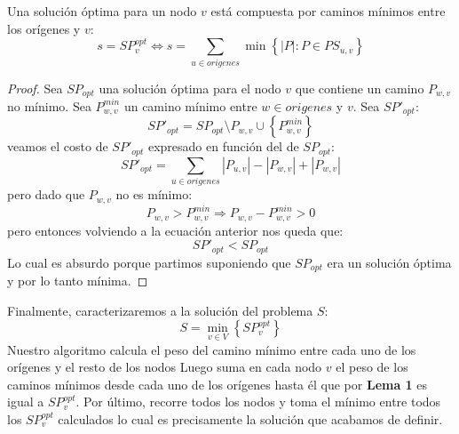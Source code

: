 \begin{lema}
\label{lema_p2}
Una solución óptima para un nodo $v$ está compuesta por caminos mínimos entre los orígenes
y $v$:
\begin{displaymath}
  s = SP_v^{opt} \Leftrightarrow s = \sum_{u \in origenes} \min \left\{ { \left\vert{P}\right\vert : P \in PS_{u, v}} \right\}
\end{displaymath}
\end{lema}
\begin{proof}
  Sea $SP_{opt}$ una solución óptima para el nodo $v$ que contiene un camino $P_{w,v}$ no mínimo. Sea $P_{w,v}^{min}$ 
un camino mínimo entre $w \in origenes$ y $v$. Sea $SP'_{opt}$:
\begin{displaymath}
SP'_{opt} = SP_{opt} \setminus P_{w, v} \cup \left\{{P_{w,v}^{min}}\right\}
\end{displaymath}
veamos el costo de $SP'_{opt}$ expresado en función del de $SP_{opt}$:
\begin{displaymath}
  SP'_{opt} = \sum_{u \in origenes} \left\vert{P_{u,v}}\right\vert - \left\vert{P_{w,v}}\right\vert + \left\vert{P_{w,v}}\right\vert
\end{displaymath}
pero dado que $P_{w,v}$ no es mínimo:
\begin{displaymath}
  P_{w,v} > P_{w,v}^{min} \Rightarrow P_{w,v} - P_{w,v}^{min} > 0
\end{displaymath}
pero entonces volviendo a la ecuación anterior nos queda que:
\begin{displaymath}
  SP'_{opt} < SP_{opt}
\end{displaymath}
Lo cual es absurdo porque partimos suponiendo que $SP_{opt}$ era un solución óptima y por lo tanto mínima.
\end{proof}

Finalmente, caracterizaremos a la solución del problema $S$:
\begin{displaymath}
  S = \min_{v \in V} \left\{ {SP_{v}^{opt}} \right\}
\end{displaymath}
Nuestro algoritmo calcula el peso del camino mínimo entre cada uno de los orígenes y el resto de los nodos \cite[p.~594]{cormen} 
Luego suma en cada nodo $v$ el peso de los caminos mínimos desde cada uno de los orígenes hasta él que por \textbf{Lema 1} es
igual a $SP_{v}^{opt}$. Por último, recorre todos los nodos y toma el mínimo entre todos los $SP_{v}^{opt}$ calculados
lo cual es precisamente la solución que acabamos de definir.

